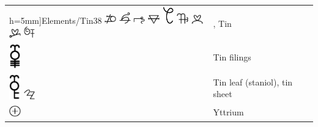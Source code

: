 \documentclass[british,final,landscape]{scrartcl}
\begin{document}
\begin{refsection}
\begin{supertabular}{p{0.3\textwidth}p{0.34\textwidth}p{0.34\textwidth}}
h=5mm]{Elements/Tin38} \includegraphics[width=5mm]{Elements/Tin39} \includegraphics[width=5mm]{Elements/Tin40} \includegraphics[width=5mm]{Elements/Tin41} \includegraphics[width=5mm]{Elements/Tin42} \includegraphics[width=5mm]{Elements/Tin43} \includegraphics[width=5mm]{Elements/Tin44} \includegraphics[width=5mm]{Elements/Tin45} \includegraphics[width=5mm]{Elements/Tin46} \includegraphics[width=5mm]{Elements/Tin47} & , Tin & \\
  \includegraphics[width=5mm]{Elements/TinFilings} & Tin filings & \\
  \includegraphics[width=5mm]{Elements/TinLeaf} \includegraphics[width=5mm]{Elements/TinLeaf2} & Tin leaf (staniol), tin sheet & \\
  \includegraphics[width=5mm]{Elements/Yttrium} & Yttrium & \\

\end{supertabular}
\end{refsection}
\end{document}
